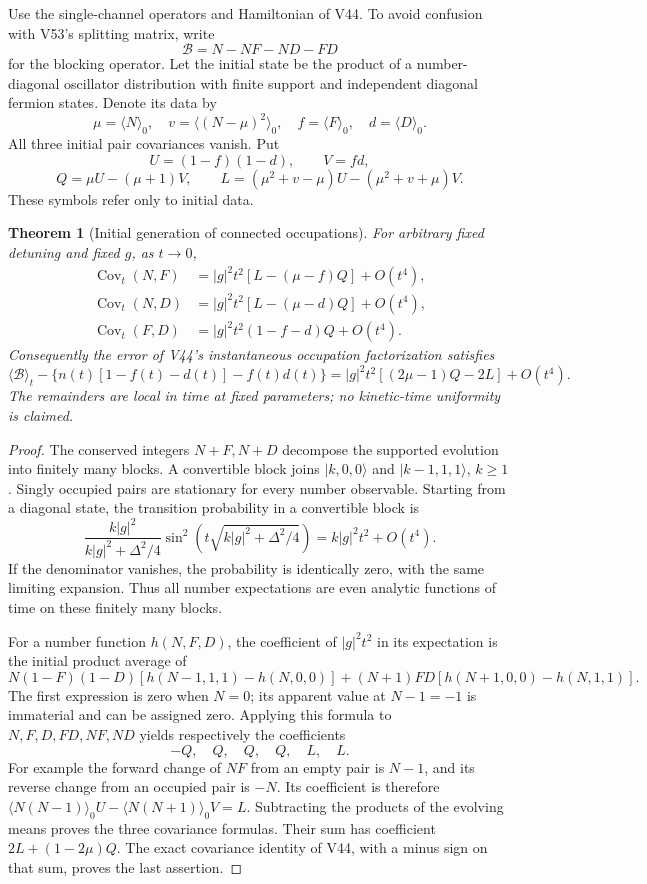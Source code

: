 \documentclass[11pt]{article}
\newtheorem{theorem}{Theorem}[section]
\theoremstyle{remark}
\begin{document}
Use the single-channel operators and Hamiltonian of V44.
To avoid confusion with V53's splitting matrix, write
\[
 \mathcal B=N-NF-ND-FD
\]
for the blocking operator.  Let the initial state be the product of
a number-diagonal oscillator distribution with finite support and
independent diagonal fermion states.  Denote its data by
\[
 \mu=\langle N\rangle_0,\quad
 v=\langle(N-\mu)^2\rangle_0,\quad
 f=\langle F\rangle_0,\quad d=\langle D\rangle_0 .
\]
All three initial pair covariances vanish.  Put
\[
 U=(1-f)(1-d),\qquad V=fd,
\]
\[
 Q=\mu U-(\mu+1)V,\qquad
 L=(\mu^2+v-\mu)U-(\mu^2+v+\mu)V .
\]
These symbols refer only to initial data.

\begin{theorem}[Initial generation of connected occupations]
\label{thm:v20v54-generation}
For arbitrary fixed detuning and fixed \(g\), as \(t\to0\),
\[
 \begin{aligned}
 \operatorname{Cov}_t(N,F)
   &=|g|^2t^2[L-(\mu-f)Q]+O(t^4),\\
 \operatorname{Cov}_t(N,D)
   &=|g|^2t^2[L-(\mu-d)Q]+O(t^4),\\
 \operatorname{Cov}_t(F,D)
   &=|g|^2t^2(1-f-d)Q+O(t^4).
 \end{aligned}
\]
Consequently the error of V44's instantaneous occupation
factorization satisfies
\[
 \langle\mathcal B\rangle_t
 -\{n(t)[1-f(t)-d(t)]-f(t)d(t)\}
 =|g|^2t^2[(2\mu-1)Q-2L]+O(t^4).
\]
The remainders are local in time at fixed parameters; no
kinetic-time uniformity is claimed.
\end{theorem}
\begin{proof}
The conserved integers \(N+F,N+D\) decompose the supported
evolution into finitely many blocks.  A convertible block joins
\(|k,0,0\rangle\) and \(|k-1,1,1\rangle\), \(k\geq1\).
Singly occupied pairs are stationary for every number observable.
Starting from a diagonal state, the transition probability in a
convertible block is
\[
 \frac{k|g|^2}{k|g|^2+\Delta^2/4}
       \sin^2\!\left(t\sqrt{k|g|^2+\Delta^2/4}\right)
       =k|g|^2t^2+O(t^4).
\]
If the denominator vanishes, the probability is identically zero,
with the same limiting expansion.  Thus all number expectations
are even analytic functions of time on these finitely many blocks.

For a number function \(h(N,F,D)\), the coefficient of
\(|g|^2t^2\) in its expectation is the initial product average of
\[
 N(1-F)(1-D)[h(N-1,1,1)-h(N,0,0)]
 +(N+1)FD[h(N+1,0,0)-h(N,1,1)].
\]
The first expression is zero when \(N=0\); its apparent value
at \(N-1=-1\) is immaterial and can be assigned zero.
Applying this formula to \(N,F,D,FD,NF,ND\) yields respectively
the coefficients
\[
 -Q,\quad Q,\quad Q,\quad Q,\quad L,\quad L.
\]
For example the forward change of \(NF\) from an empty pair
is \(N-1\), and its reverse change from an occupied pair is
\(-N\).  Its coefficient is therefore
\(\langle N(N-1)\rangle_0U-\langle N(N+1)\rangle_0V=L\).
Subtracting the products of the evolving means proves the
three covariance formulas.  Their sum has coefficient
\(2L+(1-2\mu)Q\).  The exact covariance identity of V44,
with a minus sign on that sum, proves the last assertion.
\end{proof}
\end{document}
